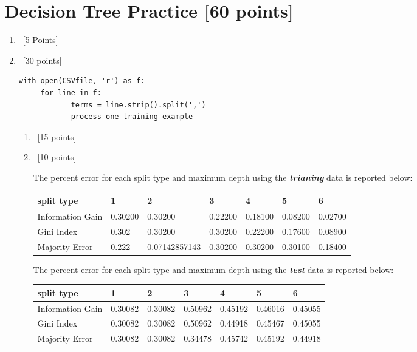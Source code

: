\documentclass[12pt, fullpage,letterpaper]{article}
\begin{document}
\section{Decision Tree Practice [60 points]}
\begin{enumerate}
	\item~[5 Points] 
	
\item~[30 points] 




\begin{lstlisting}
with open(CSVfile, 'r') as f:
     for line in f:
            terms = line.strip().split(',')
            process one training example
\end{lstlisting}
\begin{enumerate}
\item~[15 points] 
\item~[10 points] 

The percent error for each split type and maximum depth using the \emph\textbf{trianing} data is reported below:

\begin{tabular}{|l|l|l|l|l|l|l|}
	\hline
	split type       & 1       & 2             & 3       & 4       & 5       & 6       \\ \hline
	Information Gain & 0.30200 & 0.30200       & 0.22200 & 0.18100 & 0.08200 & 0.02700 \\ \hline
	Gini Index       & 0.302   & 0.30200       & 0.30200 & 0.22200 & 0.17600 & 0.08900 \\ \hline
	Majority Error   & 0.222   & 0.07142857143 & 0.30200 & 0.30200 & 0.30100 & 0.18400 \\ \hline
	\end{tabular}

The percent error for each split type and maximum depth using the \emph\textbf{test} data is reported below:

\begin{tabular}{|l|l|l|l|l|l|l|}
	\hline
	split type       & 1       & 2       & 3       & 4       & 5       & 6       \\ \hline
	Information Gain & 0.30082 & 0.30082 & 0.50962 & 0.45192 & 0.46016 & 0.45055 \\ \hline
	Gini Index       & 0.30082 & 0.30082 & 0.50962 & 0.44918 & 0.45467 & 0.45055 \\ \hline
	Majority Error   & 0.30082 & 0.30082 & 0.34478 & 0.45742 & 0.45192 & 0.44918 \\ \hline
	\end{tabular}


\end{enumerate}
\end{enumerate}
\end{document}
